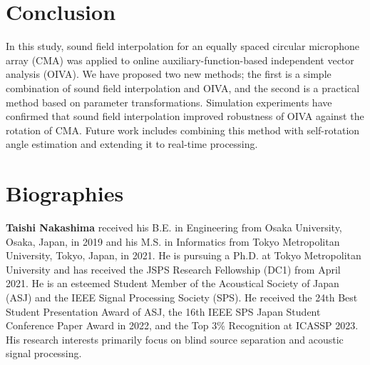 \documentclass[sip,biber]{now-journal}
\begin{document}
\section{Conclusion}\label{sec:conclusion}
In this study, sound field interpolation for an equally spaced circular microphone array (CMA) was applied to online auxiliary-function-based independent vector analysis (OIVA).
We have proposed two new methods; the first is a simple combination of sound field interpolation and OIVA, and the second is a practical method based on parameter transformations.
Simulation experiments have confirmed that sound field interpolation improved robustness of OIVA against the rotation of CMA.
Future work includes combining this method with self-rotation angle estimation \cite{Lian:2021:APSIPA} and extending it to real-time processing.

\section*{Biographies}

\noindent\normalsize\textbf{Taishi Nakashima}
received his B.E. in Engineering from Osaka University, Osaka, Japan, in 2019 and his M.S. in Informatics from Tokyo Metropolitan University, Tokyo, Japan, in 2021.
He is pursuing a Ph.D. at Tokyo Metropolitan University and has received the JSPS Research Fellowship (DC1) from April 2021.
He is an esteemed Student Member of the Acoustical Society of Japan (ASJ) and the IEEE Signal Processing Society (SPS).
He received the 24th Best Student Presentation Award of ASJ, the 16th IEEE SPS Japan Student Conference Paper Award in 2022, and the Top 3\% Recognition at ICASSP 2023.
His research interests primarily focus on blind source separation and acoustic signal processing.
\\
\end{document}
